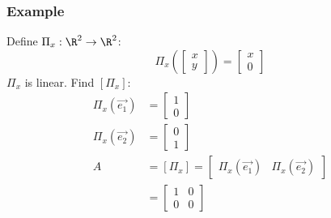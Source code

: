 \documentclass{math}
\begin{document}
\subsubsection*{Example}
Define \( \Pi_x:\R^2\to\R^2 \):
\[ \Pi_x\left(\begin{bmatrix}x \\ y\end{bmatrix}\right) = \begin{bmatrix}x \\
  0\end{bmatrix} \]
\( \Pi_x \) is linear. Find \( [\Pi_x] \):
\begin{align*}
  \Pi_x(\vec{e_1}) &= \begin{bmatrix}1 \\ 0\end{bmatrix} \\
  \Pi_x(\vec{e_2}) &= \begin{bmatrix}0 \\ 1\end{bmatrix} \\
  A &= [\Pi_x] = \begin{bmatrix}
    \Pi_x(\vec{e_1}) & \Pi_x(\vec{e_2})
  \end{bmatrix} \\
  &= \begin{bmatrix}
    1 & 0 \\
    0 & 0
  \end{bmatrix}
\end{align*}
\end{document}
